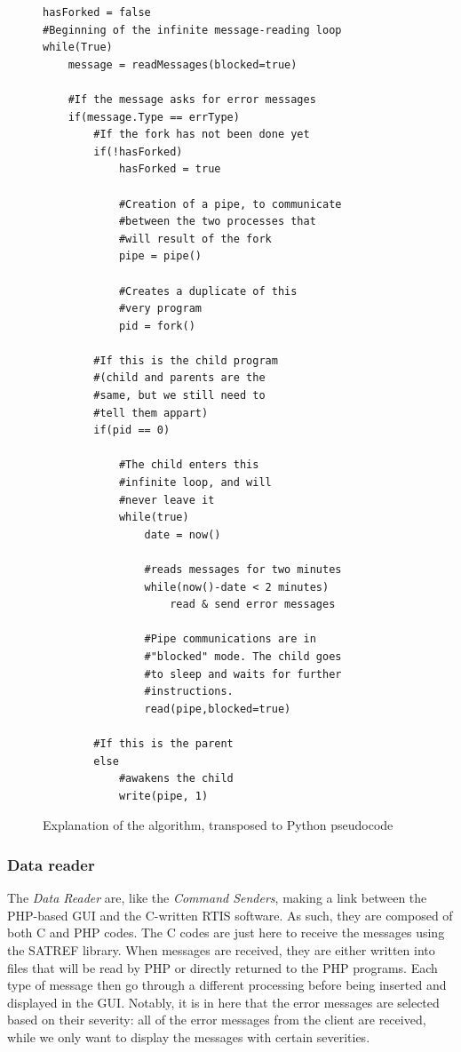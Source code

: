 \documentclass{themeensg}
\begin{document}
\begin{figure}[hb]
	\centering
	\lstset{language=Python}
 
	\begin{lstlisting}[frame=single]
hasForked = false
#Beginning of the infinite message-reading loop
while(True)	
	message = readMessages(blocked=true)
	
	#If the message asks for error messages
	if(message.Type == errType)
		#If the fork has not been done yet
		if(!hasForked)	
			hasForked = true
			
			#Creation of a pipe, to communicate
			#between the two processes that
			#will result of the fork
			pipe = pipe()
			
			#Creates a duplicate of this
			#very program
			pid = fork()
			
		#If this is the child program
		#(child and parents are the 
		#same, but we still need to
		#tell them appart)
		if(pid == 0)
		
			#The child enters this
			#infinite loop, and will
			#never leave it
			while(true)
				date = now()
				
				#reads messages for two minutes
				while(now()-date < 2 minutes)
					read & send error messages
					
				#Pipe communications are in 
				#"blocked" mode. The child goes
				#to sleep and waits for further
				#instructions.
				read(pipe,blocked=true)
				
		#If this is the parent
		else
			#awakens the child
			write(pipe, 1)				
	\end{lstlisting}
	\caption{Explanation of the algorithm, transposed to Python pseudocode}
	\label{fig:pseudocode}
\end{figure}

\subsubsection{Data reader}

The \textit{Data Reader} are, like the \textit{Command Senders}, making a link between the PHP-based GUI and the C-written RTIS software. As such, they are composed of both C and PHP codes. The C codes are just here to receive the messages using the SATREF library. When messages are received, they are either written into files that will be read by PHP or directly returned to the PHP programs.
Each type of message then go through a different processing before being inserted and displayed in the GUI. Notably, it is in here that the error messages are selected based on their severity: all of the error messages from the client are received, while we only want to display the messages with certain severities.
\end{document}
